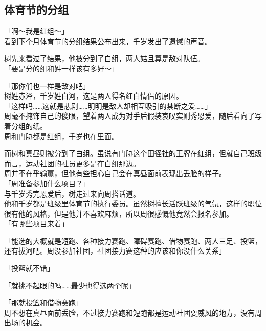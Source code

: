 \subsection{体育节的分组}

「啊～我是红组～」\\

看到下个月体育节的分组结果公布出来，千岁发出了遗憾的声音。

树先来看过了结果，他被分到了白组，两人姑且算是敌对队伍。\\

「要是分的组和姓一样该有多好～」

「那你们也一样是敌对吧」\\

树姓赤泽，千岁姓白河，这是两人得名红白情侣的原因。\\

「这样吗……这就是悲剧……明明是敌人却相互吸引的禁断之爱……」\\

周毫不掩饰自己的傻眼，望着两人成为对手后假装哀叹实则秀恩爱，随后看向了写着分组的纸。\\

周和门胁都是红组，千岁也在里面。

而树和真昼则被分到了白组。虽说有门胁这个田径社的王牌在红组，但就自己班级而言，运动社团的社员更多是在白组那边。\\

周并不在乎输赢，但他有些担心自己会在真昼面前表现出丢脸的样子。\\

「周准备参加什么项目？」\\

与千岁秀完恩爱后，树走过来向周搭话道。\\

他和千岁都是班级里体育节的执行委员。虽然树擅长活跃班级的气氛，这样的职位很有他的风格，但是他并不喜欢麻烦，所以周很感慨他竟然会报名参加。\\

「有哪些项目来着」

「能选的大概就是短跑、各种接力赛跑、障碍赛跑、借物赛跑、两人三足、投篮，还有拔河吧。周没参加社团，社团接力赛这种的应该和你没什么关系」

「投篮就不错」

「就挑不起眼的吗……最少也得选两个呢」

「那就投篮和借物赛跑」\\

周不想在真昼面前丢脸，不过接力赛跑和短跑都是运动社团耍威风的地方，没有周出场的机会。

